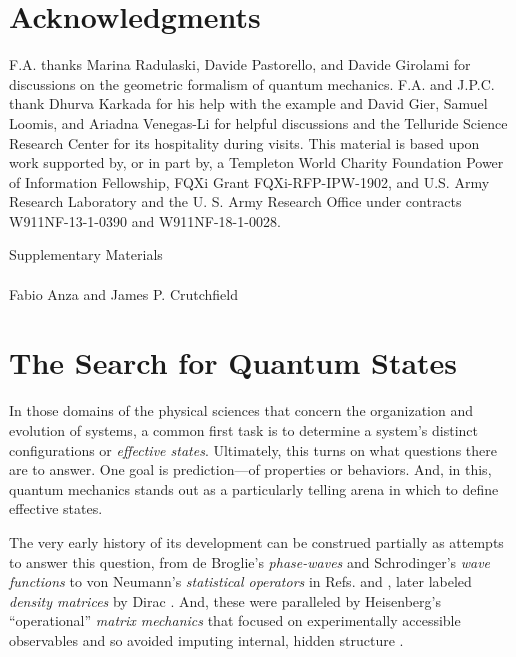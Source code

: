 \documentclass[draft,nofootinbib,pre,twocolumn,showpacs,showkeys,preprintnumbers,floatfix]{revtex4-1}
\newcommand{\1}{\mathbbm{1}}
\begin{document}
\section*{Acknowledgments}
\label{sec:acknowledgments}

F.A. thanks Marina Radulaski, Davide Pastorello, and Davide Girolami for
discussions on the geometric formalism of quantum mechanics. F.A. and J.P.C.
thank Dhurva Karkada for his help with the example and David Gier, Samuel
Loomis, and Ariadna Venegas-Li for helpful discussions and the Telluride
Science Research Center for its hospitality during visits.  This material is
based upon work supported by, or in part by, a Templeton World Charity
Foundation Power of Information Fellowship, FQXi Grant FQXi-RFP-IPW-1902, and
U.S. Army Research Laboratory and the U. S. Army Research Office under
contracts W911NF-13-1-0390 and W911NF-18-1-0028.



\makeatletter
\newcommand{\manuallabel}[2]{\def\@currentlabel{#2}\label{#1}}
\makeatother

\clearpage
\appendix
\onecolumngrid

\pagestyle{empty}

\begin{center}
\large{Supplementary Materials}\\
\vspace{0.1in}
\emph{\ourTitle}\\
\vspace{0.1in}
{\small
Fabio Anza and James P. Crutchfield
}
\end{center}

\section{The Search for Quantum States}
\label{sm:QStates}

In those domains of the physical sciences that concern the organization and
evolution of systems, a common first task is to determine a system's distinct
configurations or \emph{effective states}. Ultimately, this turns on what
questions there are to answer. One goal is prediction---of properties or
behaviors. And, in this, quantum mechanics stands out as a particularly telling
arena in which to define effective states.

The very early history of its development can be construed partially as
attempts to answer this question, from de Broglie's \emph{phase-waves}
\cite{Brog25a} and Schrodinger's \emph{wave functions} \cite{Schr26a} to von
Neumann's \emph{statistical operators} in Refs. \cite{Neum27a} and \cite[Chap.
IV]{Neum32a}, later labeled \emph{density matrices} by Dirac
\cite{Dira29a,Dira30b,Dira31a}. And, these were paralleled by Heisenberg's
``operational'' \emph{matrix mechanics} that focused on experimentally
accessible observables and so avoided imputing internal, hidden structure
\cite{Heis25a}.
\end{document}
